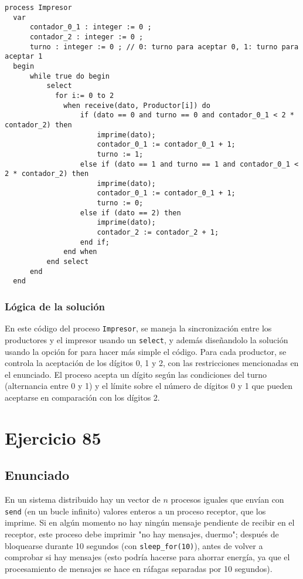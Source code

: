 \documentclass[a4paper,12pt]{article}
\begin{document}
\begin{lstlisting}[style=customcpp]
  process Impresor
  var
      contador_0_1 : integer := 0 ;
      contador_2 : integer := 0 ;
      turno : integer := 0 ; // 0: turno para aceptar 0, 1: turno para aceptar 1
  begin
      while true do begin
          select
            for i:= 0 to 2
              when receive(dato, Productor[i]) do
                  if (dato == 0 and turno == 0 and contador_0_1 < 2 * contador_2) then
                      imprime(dato);
                      contador_0_1 := contador_0_1 + 1;
                      turno := 1;
                  else if (dato == 1 and turno == 1 and contador_0_1 < 2 * contador_2) then
                      imprime(dato);
                      contador_0_1 := contador_0_1 + 1;
                      turno := 0;
                  else if (dato == 2) then
                      imprime(dato);
                      contador_2 := contador_2 + 1;
                  end if;
              end when
          end select
      end
  end
  \end{lstlisting}


\subsubsection*{Lógica de la solución}

En este código del proceso \texttt{Impresor}, se maneja la sincronización entre los productores y el impresor usando un \texttt{select}, y además diseñandolo la solución usando la opción for para hacer más simple el código. Para cada productor, se controla la aceptación de los dígitos 0, 1 y 2, con las restricciones mencionadas en el enunciado. El proceso acepta un dígito según las condiciones del turno (alternancia entre 0 y 1) y el límite sobre el número de dígitos 0 y 1 que pueden aceptarse en comparación con los dígitos 2.


\section{Ejercicio 85}

\subsection{Enunciado}

En un sistema distribuido hay un vector de \(n\) procesos iguales que envían con \texttt{send} (en un bucle infinito) valores enteros a un proceso receptor, que los imprime. Si en algún momento no hay ningún mensaje pendiente de recibir en el receptor, este proceso debe imprimir "no hay mensajes, duermo"; después de bloquearse durante 10 segundos (con \texttt{sleep\_for(10)}), antes de volver a comprobar si hay mensajes (esto podría hacerse para ahorrar energía, ya que el procesamiento de mensajes se hace en ráfagas separadas por 10 segundos).
\end{document}
